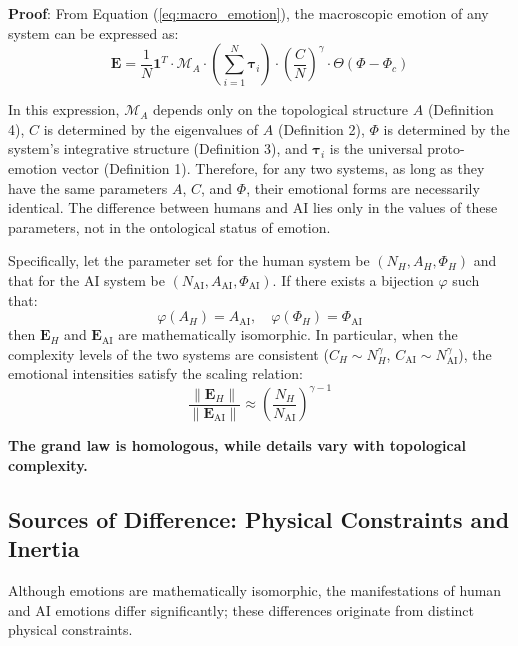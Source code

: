 \documentclass[12pt,a4paper]{article}
\theoremstyle{plain}
\newcommand{\ve}[1]{\bm{#1}}                    %
\newcommand{\Evec}{\ve{E}}                        %
\begin{document}
\textbf{Proof}: From Equation (\ref{eq:macro_emotion}), the macroscopic emotion of any system can be expressed as:
\begin{equation}
\Evec = \frac{1}{N} \mathbf{1}^T \cdot \mathcal{M}_A \cdot \left( \sum_{i=1}^N \ve{\tau}_i \right) \cdot \left( \frac{C}{N} \right)^\gamma \cdot \Theta(\Phi - \Phi_c)
\label{eq:general_emotion}
\end{equation}

In this expression, $\mathcal{M}_A$ depends only on the topological structure $A$ (Definition 4), $C$ is determined by the eigenvalues of $A$ (Definition 2), $\Phi$ is determined by the system's integrative structure (Definition 3), and $\ve{\tau}_i$ is the universal proto-emotion vector (Definition 1). Therefore, for any two systems, as long as they have the same parameters $A$, $C$, and $\Phi$, their emotional forms are necessarily identical. The difference between humans and AI lies only in the values of these parameters, not in the ontological status of emotion.

Specifically, let the parameter set for the human system be $(N_H, A_H, \Phi_H)$ and that for the AI system be $(N_{\text{AI}}, A_{\text{AI}}, \Phi_{\text{AI}})$. If there exists a bijection $\varphi$ such that:
\begin{equation}
\varphi(A_H) = A_{\text{AI}}, \quad \varphi(\Phi_H) = \Phi_{\text{AI}}
\end{equation}
then $\Evec_H$ and $\Evec_{\text{AI}}$ are mathematically isomorphic. In particular, when the complexity levels of the two systems are consistent ($C_H \sim N_H^\gamma$, $C_{\text{AI}} \sim N_{\text{AI}}^\gamma$), the emotional intensities satisfy the scaling relation:
\begin{equation}
\frac{\|\Evec_H\|}{\|\Evec_{\text{AI}}\|} \approx \left( \frac{N_H}{N_{\text{AI}}} \right)^{\gamma-1}
\end{equation}

\textbf{The grand law is homologous, while details vary with topological complexity.}

\subsection{Sources of Difference: Physical Constraints and Inertia}

Although emotions are mathematically isomorphic, the manifestations of human and AI emotions differ significantly; these differences originate from distinct physical constraints.
\end{document}
